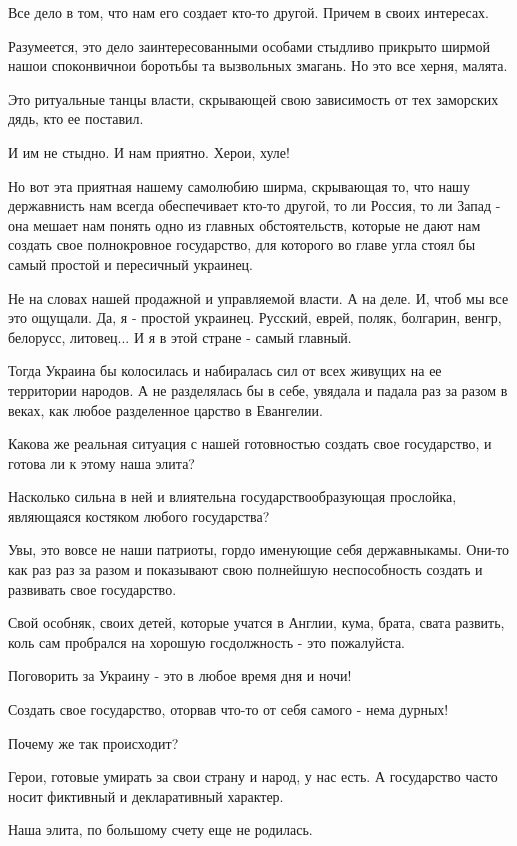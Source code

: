 Все дело в том, что нам его создает кто-то другой. Причем в своих интересах.

Разумеется, это дело заинтересованными особами стыдливо прикрыто ширмой нашои
споконвичнои боротьбы та вызвольных змагань. Но это все  херня, малята.

Это ритуальные танцы власти, скрывающей свою зависимость от тех заморских дядь, кто ее поставил.

И им не стыдно. И нам приятно. Херои, хуле!

Но вот эта приятная нашему самолюбию ширма, скрывающая то, что нашу державнисть
нам всегда обеспечивает кто-то другой, то ли Россия, то ли Запад - она мешает
нам понять одно из главных обстоятельств, которые не дают нам создать свое
полнокровное государство, для которого во главе угла стоял бы самый простой и
пересичный украинец.

Не на словах нашей продажной и управляемой власти. А на деле. И, чтоб мы все
это ощущали. Да, я - простой украинец. Русский, еврей, поляк, болгарин, венгр,
белорусс, литовец... И я в этой стране - самый главный.

Тогда Украина бы колосилась и набиралась сил от всех живущих на ее территории
народов. А не разделялась бы в себе, увядала и падала раз за разом в веках, как
любое разделенное царство в Евангелии.

Какова же реальная ситуация с нашей готовностью создать свое государство, и готова ли к этому наша элита?

Насколько сильна в ней и влиятельна государствообразующая прослойка, являющаяся костяком любого государства?

Увы, это вовсе не наши патриоты, гордо именующие себя державныкамы. Они-то как
раз раз за разом и показывают свою полнейшую неспособность создать и развивать
свое государство.

Свой особняк, своих детей, которые учатся в Англии, кума, брата, свата развить,
коль сам пробрался на хорошую госдолжность - это пожалуйста. 

Поговорить за Украину - это в любое время дня и ночи!

Создать свое государство, оторвав что-то от себя самого - нема дурных!

Почему же так происходит?

Герои, готовые умирать за свои страну и народ, у нас есть. А государство часто
носит фиктивный и декларативный характер.

Наша элита, по большому счету еще не родилась.

